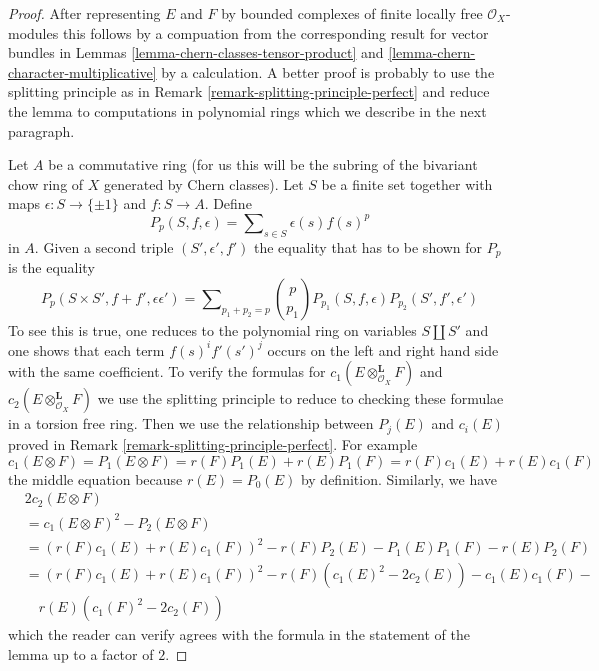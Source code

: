 \begin{proof}
After representing $E$ and $F$ by bounded complexes of finite locally
free $\mathcal{O}_X$-modules this follows by a compuation from the
corresponding result for vector bundles in
Lemmas \ref{lemma-chern-classes-tensor-product} and
\ref{lemma-chern-character-multiplicative} by a calculation.
A better proof is probably to use the splitting principle as in
Remark \ref{remark-splitting-principle-perfect}
and reduce the lemma to computations in polynomial rings 
which we describe in the next paragraph.

\medskip\noindent
Let $A$ be a commutative ring (for us this will be the subring of the
bivariant chow ring of $X$ generated by Chern classes).
Let $S$ be a finite set together with maps $\epsilon : S \to \{\pm 1\}$
and $f : S \to A$. Define
$$
P_p(S, f , \epsilon) = \sum\nolimits_{s \in S} \epsilon(s) f(s)^p
$$
in $A$. Given a second triple $(S', \epsilon', f')$
the equality that has to be shown for $P_p$ is the equality
$$
P_p(S \times S', f + f' , \epsilon \epsilon') = 
\sum\nolimits_{p_1 + p_2 = p}
{p \choose p_1} P_{p_1}(S, f, \epsilon) P_{p_2}(S', f', \epsilon')
$$
To see this is true, one reduces to the polynomial ring on variables
$S \amalg S'$ and one shows that each term $f(s)^if'(s')^j$ occurs
on the left and right hand side with the same coefficient.
To verify the formulas for $c_1(E \otimes_{\mathcal{O}_X}^\mathbf{L} F)$
and $c_2(E \otimes_{\mathcal{O}_X}^\mathbf{L} F)$ we use the splitting
principle to reduce to checking these formulae in a torsion free ring.
Then we use the relationship between $P_j(E)$ and $c_i(E)$ proved
in Remark \ref{remark-splitting-principle-perfect}. For example
$$
c_1(E \otimes F) = P_1(E \otimes F) = r(F)P_1(E) + r(E)P_1(F) =
r(F)c_1(E) + r(E)c_1(F)
$$
the middle equation because $r(E) = P_0(E)$ by definition. Similarly, we have
\begin{align*}
& 2c_2(E \otimes F) \\
& = c_1(E \otimes F)^2 - P_2(E \otimes F) \\
& =
(r(F)c_1(E) + r(E)c_1(F))^2 -
r(F)P_2(E) - P_1(E)P_1(F) - r(E)P_2(F) \\
& =
(r(F)c_1(E) + r(E)c_1(F))^2 -
r(F)(c_1(E)^2 - 2c_2(E)) - c_1(E)c_1(F) - \\
& \quad r(E)(c_1(F)^2 - 2c_2(F))
\end{align*}
which the reader can verify agrees with the formula in the statement
of the lemma up to a factor of $2$.
\end{proof}








